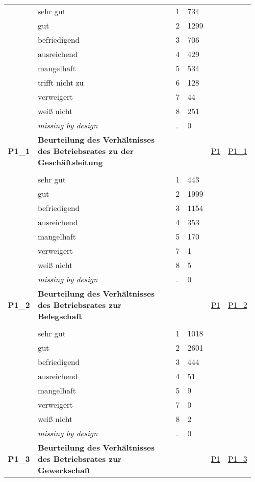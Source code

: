 \begin{longtable}{| L{2.45cm} | L{6cm} | C{1.5cm} | R{1cm} | C{2.25cm} | C{2.25cm} |}
   & sehr gut & 1 & 734 &  &  \\ 
   & gut & 2 & 1299 &  &  \\ 
   & befriedigend & 3 & 706 &  &  \\ 
   & ausreichend & 4 & 429 &  &  \\ 
   & mangelhaft & 5 & 534 &  &  \\ 
   & trifft nicht zu & 6 & 128 &  &  \\ 
   & verweigert & 7 & 44 &  &  \\ 
   & weiß nicht & 8 & 251 &  &  \\ 
   & \textit{missing by design} & \textit{.} & 0 &  &  \\ 
   \midrule
\textbf{P1\_1}\label{var:P1:1} & \textbf{Beurteilung des Verhältnisses des Betriebsrates zu der Geschäftsleitung} &  &  & \hyperref[P1]{P1} & \hyperref[var:suf:P1:1]{P1\_1} \\ 
   &  &  &  &  &  \\ 
   & sehr gut & 1 & 443 &  &  \\ 
   & gut & 2 & 1999 &  &  \\ 
   & befriedigend & 3 & 1154 &  &  \\ 
   & ausreichend & 4 & 353 &  &  \\ 
   & mangelhaft & 5 & 170 &  &  \\ 
   & verweigert & 7 & 1 &  &  \\ 
   & weiß nicht & 8 & 5 &  &  \\ 
   & \textit{missing by design} & \textit{.} & 0 &  &  \\ 
   \midrule
\textbf{P1\_2}\label{var:P1:2} & \textbf{Beurteilung des Verhältnisses des Betriebsrates zur Belegschaft} &  &  & \hyperref[P1]{P1} & \hyperref[var:suf:P1:2]{P1\_2} \\ 
   &  &  &  &  &  \\ 
   & sehr gut & 1 & 1018 &  &  \\ 
   & gut & 2 & 2601 &  &  \\ 
   & befriedigend & 3 & 444 &  &  \\ 
   & ausreichend & 4 & 51 &  &  \\ 
   & mangelhaft & 5 & 9 &  &  \\ 
   & verweigert & 7 & 0 &  &  \\ 
   & weiß nicht & 8 & 2 &  &  \\ 
   & \textit{missing by design} & \textit{.} & 0 &  &  \\ 
   \midrule
\textbf{P1\_3}\label{var:P1:3} & \textbf{Beurteilung des Verhältnisses des Betriebsrates zur Gewerkschaft} &  &  & \hyperref[P1]{P1} & \hyperref[var:suf:P1:3]{P1\_3} \\ 

\end{longtable}
